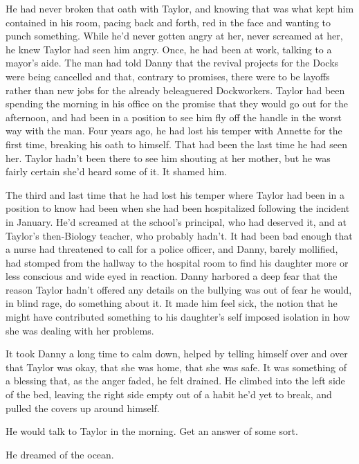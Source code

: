 He had never broken that oath with Taylor, and knowing that was what kept him contained in his room, pacing back and forth, red in the face and wanting to punch something. While he'd never gotten angry at her, never screamed at her, he knew Taylor had seen him angry. Once, he had been at work, talking to a mayor's aide. The man had told Danny that the revival projects for the Docks were being cancelled and that, contrary to promises, there were to be layoffs rather than new jobs for the already beleaguered Dockworkers. Taylor had been spending the morning in his office on the promise that they would go out for the afternoon, and had been in a position to see him fly off the handle in the worst way with the man. Four years ago, he had lost his temper with Annette for the first time, breaking his oath to himself. That had been the last time he had seen her. Taylor hadn't been there to see him shouting at her mother, but he was fairly certain she'd heard some of it. It shamed him.

The third and last time that he had lost his temper where Taylor had been in a position to know had been when she had been hospitalized following the incident in January. He'd screamed at the school's principal, who had deserved it, and at Taylor's then-Biology teacher, who probably hadn't. It had been bad enough that a nurse had threatened to call for a police officer, and Danny, barely mollified, had stomped from the hallway to the hospital room to find his daughter more or less conscious and wide eyed in reaction. Danny harbored a deep fear that the reason Taylor hadn't offered any details on the bullying was out of fear he would, in blind rage, do something about it. It made him feel sick, the notion that he might have contributed something to his daughter's self imposed isolation in how she was dealing with her problems.

It took Danny a long time to calm down, helped by telling himself over and over that Taylor was okay, that she was home, that she was safe. It was something of a blessing that, as the anger faded, he felt drained. He climbed into the left side of the bed, leaving the right side empty out of a habit he'd yet to break, and pulled the covers up around himself.

He would talk to Taylor in the morning. Get an answer of some sort.

He dreamed of the ocean.
